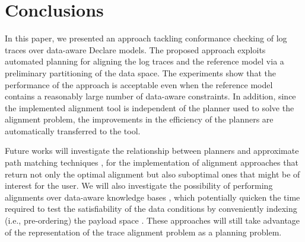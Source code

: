 \section{Conclusions}\label{sec:end}
In this paper, we presented an approach tackling conformance checking of log traces over data-aware Declare models. The proposed approach exploits automated planning for aligning the log traces and the reference model via a preliminary partitioning of the data space. The experiments show that the performance of the approach is acceptable even when the reference model contains a reasonably large number of data-aware constraints. In addition, since the implemented alignment tool is independent of the planner used to solve the alignment problem, the improvements in the efficiency of the planners are automatically transferred to the tool.

Future works will investigate the relationship between planners and approximate path matching techniques \cite{Myers1989}, for the implementation of alignment approaches that return not only the optimal alignment but also suboptimal ones that might be of interest for the user. We will also investigate the possibility of performing alignments over data-aware knowledge bases \cite{10.1007/978-3-319-39696-5_18}, which potentially quicken the time required to test the satisfiability of the data conditions by conveniently indexing (i.e., pre-ordering) the payload space \cite{IdreosGNMMK12}. These approaches will still take advantage of the representation of the trace alignment problem as a planning problem. 